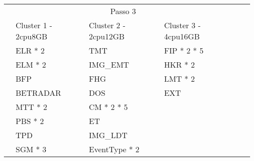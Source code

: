 \begin{table}[H]
  \centering
  \small
  \setlength{\extrarowheight}{3pt}
  \setlength{\arrayrulewidth}{1pt}
  
  \begin{tabular}{|l|l|l|l|l|l|}
    \hline
    \cellcolor{white} & \multicolumn{3}{|c|}{\cellcolor[HTML]{FBE6A3}Passo 3} & \cellcolor{white}             & \cellcolor{white}  \\ \cline{2-5} 
                                     & \cellcolor[HTML]{4EAC5B}Cluster 1 - 2cpu8GB & \cellcolor[HTML]{4EAC5B}Cluster 2 - 2cpu12GB & \cellcolor[HTML]{4EAC5B}Cluster 3 - 4cpu16GB &                              & \\ \cline{3-4}
                                     & \cellcolor[HTML]{A9D08E}ELR * 2             & \cellcolor[HTML]{BDD7EE}TMT                & \cellcolor[HTML]{A9D08E}FIP * 2 * 5       &                              & \\ \cline{3-4}
                                     & \cellcolor[HTML]{A9D08E}ELM * 2             & \cellcolor[HTML]{BDD7EE}IMG\_EMT           & \cellcolor[HTML]{A9D08E}HKR * 2           &                              & \\ \cline{3-4}
                                     & \cellcolor[HTML]{A9D08E}BFP                 & \cellcolor[HTML]{BDD7EE}FHG                & \cellcolor[HTML]{BDD7EE}LMT * 2           &                              & \\ \cline{3-4}
                                     & \cellcolor[HTML]{A9D08E}BETRADAR            & \cellcolor[HTML]{BDD7EE}DOS                & \cellcolor[HTML]{BDD7EE}EXT               &                              & \\ \cline{3-4}
                                     & \cellcolor[HTML]{BDD7EE}MTT * 2             & \cellcolor[HTML]{BDD7EE}CM * 2 * 5         &                                           &                              & \\ 
                                     & \cellcolor[HTML]{BDD7EE}PBS * 2             & \cellcolor[HTML]{BDD7EE}ET     &                                           &                              & \\ 
                                     & \cellcolor[HTML]{BDD7EE}TPD                 & \cellcolor[HTML]{BDD7EE}IMG\_LDT          &                                           &                              & \\ 
                                     & \cellcolor[HTML]{BDD7EE}SGM * 3             & \cellcolor[HTML]{A9D08E}EventType * 2                &            &                              & \\ 

\end{tabular}
\end{table}
